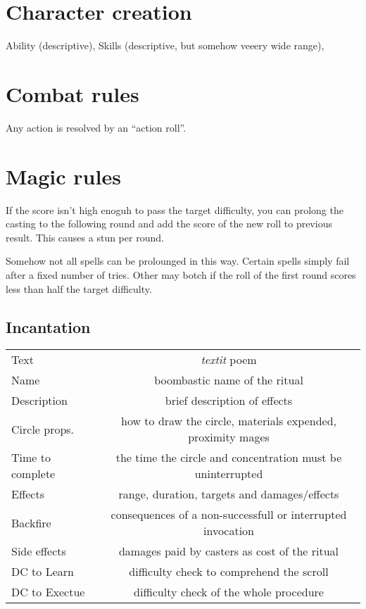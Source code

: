 \documentclass[10pt,a4paper]{article}
\author{Frà}
\begin{document}
\section{Character creation}
Ability (descriptive), Skills (descriptive, but somehow veeery wide range), 

\section{Combat rules}
Any action is resolved by an ``action roll''. 


\section{Magic rules}
If the score isn't high enoguh to pass the target difficulty, you can prolong the casting to the following round and add the score of 
the new roll to previous result. This causes a stun per round. 

Somehow not all spells can be prolounged in this way. Certain spells simply fail after a fixed number of tries. Other may botch if the roll of the first round scores less than half the target difficulty.



\subsection{Incantation}
\begin{tabular}{ l c }
  Text & \textit{textit} poem \\
  Name & boombastic name of the ritual  \\ 
  Description & brief description of effects \\
  Circle props. & how to draw the circle, materials expended, proximity mages  \\
  Time to complete & the time the circle and concentration must be uninterrupted \\
  Effects &  range, duration, targets and damages/effects \\
  Backfire & consequences of a non-successfull or interrupted invocation \\
  Side effects & damages paid by casters as cost of the ritual \\
  DC to Learn & difficulty check to comprehend the scroll \\
  DC to Exectue & difficulty check of the whole procedure \\
\end{tabular}
\end{document}
